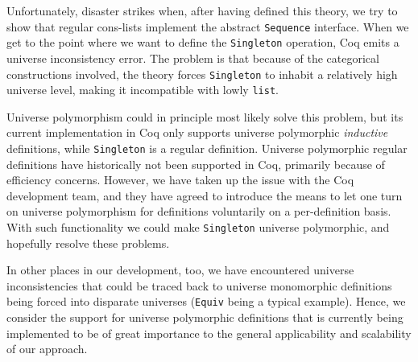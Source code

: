 \documentclass[a4paper,10pt,runningheads]{llncs}
\begin{document}
Unfortunately, disaster strikes when, after having defined this theory, we try to show that regular cons-lists implement the abstract \lstinline|Sequence| interface. When we get to the point where we want to define the \lstinline|Singleton| operation, Coq emits a universe inconsistency error. The problem is that because of the categorical constructions involved, the theory forces \lstinline|Singleton| to inhabit a relatively high universe level, making it incompatible with lowly \lstinline|list|.

Universe polymorphism could in principle most likely solve this problem, but its current implementation in Coq only supports universe polymorphic \emph{inductive} definitions, while \lstinline|Singleton| is a regular definition. Universe polymorphic regular definitions have historically not been supported in Coq, primarily because of efficiency concerns. However, we have taken up the issue with the Coq development team, and they have agreed to introduce the means to let one turn on universe polymorphism for definitions voluntarily on a per-definition basis. With such functionality we could make \lstinline|Singleton| universe polymorphic, and hopefully resolve these problems.

In other places in our development, too, we have encountered universe inconsistencies that could be traced back to universe monomorphic definitions being forced into disparate universes (\lstinline|Equiv| being a typical example). Hence, we consider the support for universe polymorphic definitions that is currently being implemented to be of great importance to the general applicability and scalability of our approach.


\begin{comment}
Canonical structures have been used to provide a uniform treatment~\cite{bertot2008canonical} of big
operators, like $\Pi,\Sigma, \max$. These operators extend a pair of a binary and a 0-ary operation
to an $n$-ary operation for any $n$. Categorically, one considers the algebra maps from non-empty
lists, lists, inhabited finite sets and finite sets to the carrier of a semigroup, monoid,
commutative semigroup, commutative monoid. Hence we want to reuse the libraries for lists etc.\ as much as possible.

Again, we can use type classes, instead of canonical structures, to deduce the relevant monoid operation:
\begin{lstlisting}
  Definition seq_sum
    `{Sequence A T} `{RingPlus A} `{z: RingZero A}: T $\to$ A
    := @seq_to_monoid A T _ A ring_plus z id.
  Eval compute in seq_sum [3; 2].
\end{lstlisting}
\end{comment}
\end{document}
